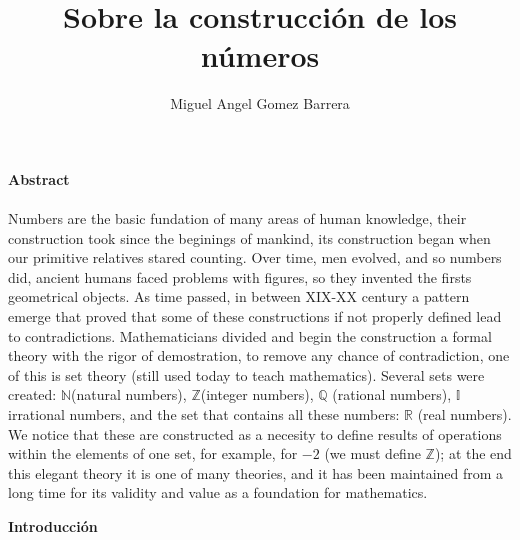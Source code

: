 \documentclass{article}
\title{Sobre la construcción de los números}
\author{Miguel Angel Gomez Barrera}
\begin{document}
\maketitle

\begin{center}\textbf{Abstract}\end{center}
\paragraph{} Numbers are the basic fundation of many areas of human knowledge, their construction took since the beginings of mankind, its construction began when our primitive relatives stared counting. Over time, men evolved, and so numbers did, ancient humans faced problems with figures, so they invented the firsts geometrical objects. As time passed, in between XIX-XX century a pattern emerge that proved that some of these constructions if not properly defined lead to contradictions. Mathematicians divided and begin the construction a formal theory with the rigor of demostration, to remove any chance of contradiction, one of this is set theory (still used today to teach mathematics). Several sets were created: $\mathbb{N}$(natural numbers), $\mathbb{Z}$(integer numbers), $\mathbb{Q}$ (rational numbers), $\mathbb{I}$ irrational numbers, and the set that contains all these numbers: $\mathbb{R}$ (real numbers). We notice that these are constructed as a necesity to define results of operations within the elements of one set, for example, for $-2$ (we must define $\mathbb{Z}$); at the end this elegant theory it is one of many theories, and it has been maintained from a long time for its validity and value as a foundation for mathematics.

\begin{center}\textbf{Introducción}\end{center}
\end{document}
